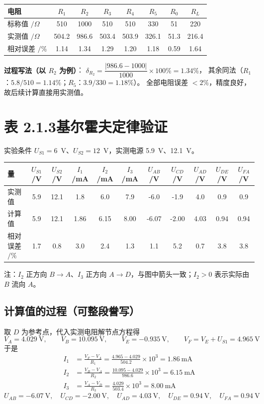 \documentclass[UTF8,a4paper,10.5pt]{ctexart}
\begin{document}
\begin{center}
\small\setlength{\tabcolsep}{5pt}
\begin{tabular}{@{}l*{7}{c}@{}}
\toprule
电阻 & $R_1$ & $R_2$ & $R_3$ & $R_4$ & $R_5$ & $R_0$ & $R_L$\\
\midrule
标称值 $/\Omega$ & 510 & 1000 & 510 & 510 & 330 & 51 & 220\\
实测值 $/\Omega$ & 504.2 & 986.6 & 503.4 & 503.9 & 326.1 & 51.3 & 216.4\\
相对误差 $/\%$ & 1.14 & 1.34 & 1.29 & 1.20 & 1.18 & 0.59 & 1.64\\
\bottomrule
\end{tabular}
\end{center}

\noindent\textbf{过程写法（以 $R_2$ 为例）}：
$\delta_{R_2}=\dfrac{|986.6-1000|}{1000}\times100\%=1.34\%$，
其余同法（$R_1$：$5.8/510=1.14\%$；$R_5$：$3.9/330=1.18\%$）。
全部电阻误差 $<2\%$，精度良好，故后续计算直接用实测值。

\section{表 2.1.3\quad 基尔霍夫定律验证}
实验条件 $U_{S1}=6$~V、$U_{S2}=12$~V，实测电源 5.9~V、12.1~V。

\begin{center}
\scriptsize\setlength{\tabcolsep}{3.0pt}
\begin{tabular}{@{}l*{10}{c}@{}}
\toprule
量 & $U_{S1}$/V & $U_{S2}$/V & $I_1$/mA & $I_2$/mA & $I_3$/mA & $U_{AB}$/V & $U_{CD}$/V & $U_{AD}$/V & $U_{DE}$/V & $U_{FA}$/V\\
\midrule
实测值 & 5.9 & 12.1 & 1.8 & 6.0 & 7.9 & -6.0 & -1.9 & 4.0 & 0.9 & 0.9\\
计算值 & 5.9 & 12.1 & 1.86 & 6.15 & 8.00 & -6.07 & -2.00 & 4.03 & 0.94 & 0.94\\
相对误差 $/\%$ & 1.7 & 0.8 & 3.0 & 2.4 & 1.3 & 1.1 & 5.2 & 0.7 & 3.8 & 3.8\\
\bottomrule
\end{tabular}
\end{center}
{\scriptsize 注：$I_2$ 正方向 $B\to A$、$I_3$ 正方向 $A\to D$，与图中箭头一致；$I_2>0$ 表示实际由 $B$ 流向 $A$。}

\subsection*{计算值的过程（可整段誊写）}
取 $D$ 为参考点，代入实测电阻解节点方程得
\[
V_A=4.029\ \text{V},\qquad V_B=10.095\ \text{V},\qquad V_E=-0.935\ \text{V},\qquad V_F=V_E+U_{S1}=4.965\ \text{V}
\]
于是
\begin{align*}
I_1&=\frac{V_F-V_A}{R_1}=\frac{4.965-4.029}{504.2}\times10^3=1.86\ \text{mA}\\
I_2&=\frac{V_B-V_A}{R_2}=\frac{10.095-4.029}{986.6}\times10^3=6.15\ \text{mA}\\
I_3&=\frac{V_A-V_D}{R_3}=\frac{4.029}{503.4}\times10^3=8.00\ \text{mA}
\end{align*}
\[
U_{AB}=-6.07\ \text{V},\quad U_{CD}=-2.00\ \text{V},\quad U_{AD}=4.03\ \text{V},\quad
U_{DE}=0.94\ \text{V},\quad U_{FA}=0.94\ \text{V}
\]
\end{document}
